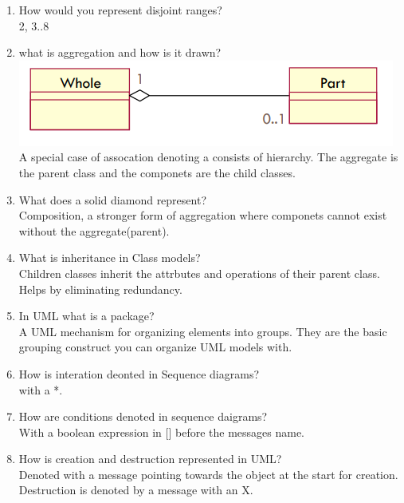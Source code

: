 \documentclass[10pt]{article}
\begin{document}
\begin{enumerate}
      \item How would you represent disjoint ranges?\\
            2, 3..8\\

      \item what is aggregation and how is it drawn?\\
            \includegraphics*[scale=.5]{aggregation.png}\\
            A special case of assocation denoting a consists of hierarchy. The aggregate is the parent class and the componets are the child classes.\\

      \item What does a solid diamond represent?\\
            Composition, a stronger form of aggregation where componets cannot exist without the aggregate(parent).\\

      \item What is inheritance in Class models?\\
            Children classes inherit the attrbutes and operations of their parent class. Helps by eliminating redundancy.\\

      \item In UML what is a package?\\
            A UML mechanism for organizing elements into groups. They are the basic grouping construct you can organize UML models with.\\

      \item How is interation deonted in Sequence diagrams?\\
            with a *.\\
      \item How are conditions denoted in sequence daigrams?\\
            With a boolean expression in [] before the messages name.\\

      \item How is creation and destruction represented in UML?\\
            Denoted with a message pointing towards the object at the start for creation. Destruction is denoted by a message with an X.\\


\end{enumerate}
\end{document}
